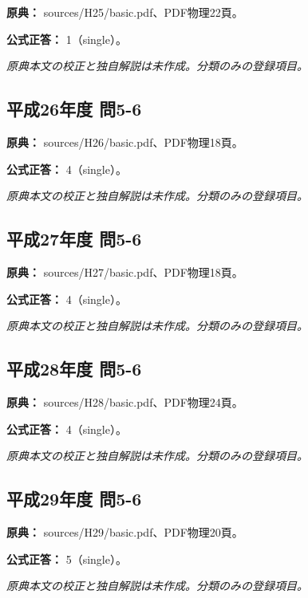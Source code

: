 \noindent\textbf{原典：} sources/H25/basic.pdf、PDF物理22頁。

\textbf{公式正答：} 1（single）。

\par\textit{原典本文の校正と独自解説は未作成。分類のみの登録項目。}

\subsection{平成26年度 問5-6}
\label{q:h26-reg-basic-5-6}

\noindent\textbf{原典：} sources/H26/basic.pdf、PDF物理18頁。

\textbf{公式正答：} 4（single）。

\par\textit{原典本文の校正と独自解説は未作成。分類のみの登録項目。}

\subsection{平成27年度 問5-6}
\label{q:h27-reg-basic-5-6}

\noindent\textbf{原典：} sources/H27/basic.pdf、PDF物理18頁。

\textbf{公式正答：} 4（single）。

\par\textit{原典本文の校正と独自解説は未作成。分類のみの登録項目。}

\subsection{平成28年度 問5-6}
\label{q:h28-reg-basic-5-6}

\noindent\textbf{原典：} sources/H28/basic.pdf、PDF物理24頁。

\textbf{公式正答：} 4（single）。

\par\textit{原典本文の校正と独自解説は未作成。分類のみの登録項目。}

\subsection{平成29年度 問5-6}
\label{q:h29-reg-basic-5-6}

\noindent\textbf{原典：} sources/H29/basic.pdf、PDF物理20頁。

\textbf{公式正答：} 5（single）。

\par\textit{原典本文の校正と独自解説は未作成。分類のみの登録項目。}


